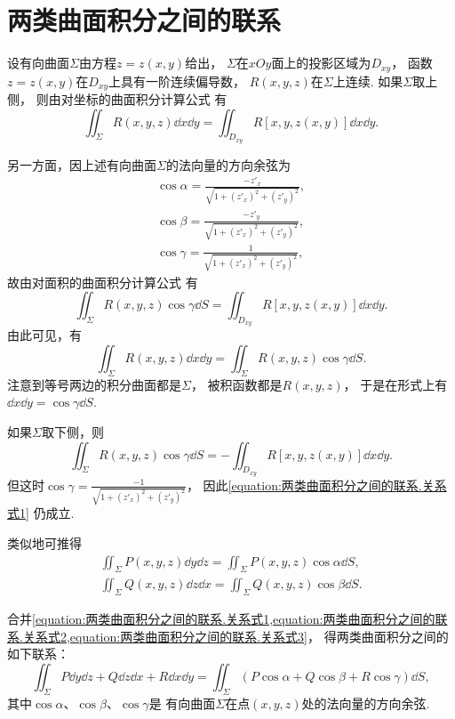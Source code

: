 \section{两类曲面积分之间的联系}
设有向曲面\(\Sigma\)由方程\(z = z(x,y)\)给出，
\(\Sigma\)在\(xOy\)面上的投影区域为\(D_{xy}\)，
函数\(z = z(x,y)\)在\(D_{xy}\)上具有一阶连续偏导数，
\(R(x,y,z)\)在\(\Sigma\)上连续.
如果\(\Sigma\)取上侧，
则由对坐标的曲面积分计算公式  有\[
	\iint_\Sigma R(x,y,z) \dd{x}\dd{y} = \iint_{D_{xy}} R[x,y,z(x,y)] \dd{x}\dd{y}.
\]

另一方面，因上述有向曲面\(\Sigma\)的法向量的方向余弦为\[
	\begin{split}
		\cos\alpha=\frac{-z'_x}{\sqrt{1+(z'_x)^2+(z'_y)^2}}, \\
		\cos\beta=\frac{-z'_y}{\sqrt{1+(z'_x)^2+(z'_y)^2}}, \\
		\cos\gamma=\frac{1}{\sqrt{1+(z'_x)^2+(z'_y)^2}},
	\end{split}
\]
故由对面积的曲面积分计算公式  有\[
	\iint_\Sigma R(x,y,z) \cos\gamma \dd{S}
	= \iint_{D_{xy}} R[x,y,z(x,y)] \dd{x}\dd{y}.
\]
由此可见，有\begin{equation}\label{equation:两类曲面积分之间的联系.关系式1}
	\iint_\Sigma R(x,y,z) \dd{x}\dd{y}
	= \iint_\Sigma R(x,y,z) \cos\gamma \dd{S}.
\end{equation}
注意到等号两边的积分曲面都是\(\Sigma\)，
被积函数都是\(R(x,y,z)\)，
于是在形式上有\(\dd{x}\dd{y} = \cos\gamma \dd{S}\).

如果\(\Sigma\)取下侧，则\[
	\iint_\Sigma R(x,y,z) \cos\gamma \dd{S}
	= -\iint_{D_{xy}} R[x,y,z(x,y)] \dd{x}\dd{y}.
\]
但这时\(\cos\gamma=\frac{-1}{\sqrt{1+(z'_x)^2+(z'_y)^2}}\)，
因此\cref{equation:两类曲面积分之间的联系.关系式1} 仍成立.

类似地可推得\begin{gather}
	\iint_\Sigma P(x,y,z) \dd{y}\dd{z}
	= \iint_\Sigma P(x,y,z) \cos\alpha \dd{S},
	\label{equation:两类曲面积分之间的联系.关系式2} \\
	\iint_\Sigma Q(x,y,z) \dd{z}\dd{x}
	= \iint_\Sigma Q(x,y,z) \cos\beta \dd{S}.
	\label{equation:两类曲面积分之间的联系.关系式3}
\end{gather}

合并\cref{equation:两类曲面积分之间的联系.关系式1,equation:两类曲面积分之间的联系.关系式2,equation:两类曲面积分之间的联系.关系式3}，
得两类曲面积分之间的如下联系：
\begin{equation}\label{equation:线积分与面积分.两类曲面积分之间的联系}
	\iint_\Sigma P \dd{y}\dd{z} + Q \dd{z}\dd{x} + R \dd{x}\dd{y}
	=\iint_\Sigma (P\cos\alpha+Q\cos\beta+R\cos\gamma) \dd{S},
\end{equation}
其中\(\cos\alpha\)、\(\cos\beta\)、\(\cos\gamma\)是
有向曲面\(\Sigma\)在点\((x,y,z)\)处的法向量的方向余弦.

